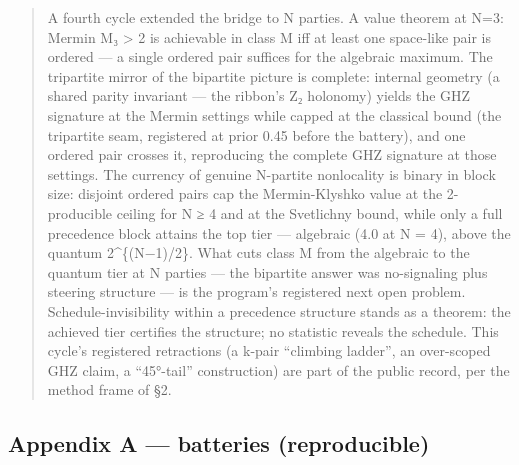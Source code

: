 \documentclass[
  11pt]{article}
\begin{document}
\begin{quote}
A fourth cycle extended the bridge to N parties. A value theorem at N=3:
Mermin M₃ \textgreater{} 2 is achievable in class M iff at least one
space-like pair is ordered --- a single ordered pair suffices for the
algebraic maximum. The tripartite mirror of the bipartite picture is
complete: internal geometry (a shared parity invariant --- the ribbon's
Z₂ holonomy) yields the GHZ signature at the Mermin settings while
capped at the classical bound (the tripartite seam, registered at prior
0.45 before the battery), and one ordered pair crosses it, reproducing
the complete GHZ signature at those settings. The currency of genuine
N-partite nonlocality is binary in block size: disjoint ordered pairs
cap the Mermin-Klyshko value at the 2-producible ceiling for N ≥ 4 and
at the Svetlichny bound, while only a full precedence block attains the
top tier --- algebraic (4.0 at N = 4), above the quantum
2\^{}\{(N−1)/2\}. What cuts class M from the algebraic to the quantum
tier at N parties --- the bipartite answer was no-signaling plus
steering structure --- is the program's registered next open problem.
Schedule-invisibility within a precedence structure stands as a theorem:
the achieved tier certifies the structure; no statistic reveals the
schedule. This cycle's registered retractions (a k-pair ``climbing
ladder'', an over-scoped GHZ claim, a ``45°-tail'' construction) are
part of the public record, per the method frame of §2.
\end{quote}

\subsection{Appendix A --- batteries
(reproducible)}\label{appendix-a-batteries-reproducible}
\end{document}
